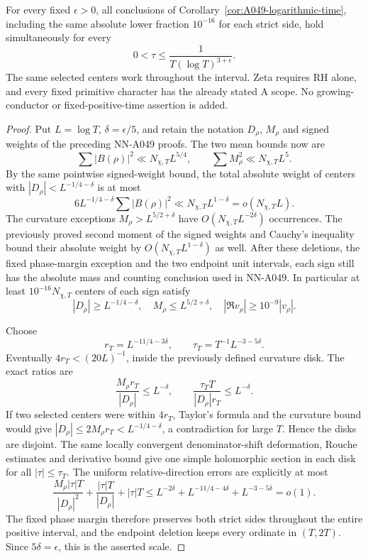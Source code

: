 \begin{corollary}
\label{cor:A049-logarithmic-three}
For every fixed \(\epsilon>0\), all conclusions of
Corollary~\ref{cor:A049-logarithmic-time}, including the same
absolute lower fraction \(10^{-16}\) for each strict side,
hold simultaneously for every
\[
                         0<\tau\le
                           \frac1{T(\log T)^{3+\epsilon}}.
\]
The same selected centers work throughout the interval.
Zeta requires RH alone, and every fixed primitive character
has the already stated A scope. No growing-conductor or
fixed-positive-time assertion is added.
\end{corollary}

\begin{proof}
Put \(L=\log T\), \(\delta=\epsilon/5\), and retain the
notation \(D_\rho\), \(M_\rho\) and signed weights of the
preceding NN-A049 proofs. The two mean bounds now are
\[
 \sum|B(\rho)|^2\ll N_{\chi,T}L^{5/4},\qquad
 \sum M_\rho^2\ll N_{\chi,T}L^5.
\]
By the same pointwise signed-weight bound, the total absolute
weight of centers with \(|D_\rho|<L^{-1/4-\delta}\) is at most
\[
                 6L^{-1/4-\delta}\sum|B(\rho)|^2
                       \ll N_{\chi,T}L^{1-\delta}
                         =o(N_{\chi,T}L).
\]
The curvature exceptions \(M_\rho>L^{5/2+\delta}\) have
\(O(N_{\chi,T}L^{-2\delta})\) occurrences. The previously
proved second moment of the signed weights and Cauchy's
inequality bound their absolute weight by
\(O(N_{\chi,T}L^{1-\delta})\) as well.
After these deletions, the fixed phase-margin exception and
the two endpoint unit intervals, each sign still has the
absolute mass and counting conclusion used in NN-A049.
In particular at least \(10^{-16}N_{\chi,T}\) centers of
each sign satisfy
\[
 |D_\rho|\ge L^{-1/4-\delta},\quad
 M_\rho\le L^{5/2+\delta},\quad
 |\Re v_\rho|\ge10^{-9}|v_\rho|.
\]

Choose
\[
 r_T=L^{-11/4-3\delta},\qquad
 \tau_T=T^{-1}L^{-3-5\delta}.
\]
Eventually \(4r_T<(20L)^{-1}\), inside the previously
defined curvature disk. The exact ratios are
\[
 \frac{M_\rho r_T}{|D_\rho|}\le L^{-\delta},\qquad
 \frac{\tau_TT}{|D_\rho|r_T}\le L^{-\delta}.
\]
If two selected centers were within \(4r_T\), Taylor's
formula and the curvature bound would give
\(|D_\rho|\le2M_\rho r_T< L^{-1/4-\delta}\), a contradiction
for large \(T\). Hence the disks are disjoint.
The same locally convergent denominator-shift deformation,
Rouche estimates and derivative bound give one simple
holomorphic section in each disk for all \(|\tau|\le\tau_T\).
The uniform relative-direction errors are explicitly at most
\[
 \frac{M_\rho|\tau|T}{|D_\rho|^2}
       +\frac{|\tau|T}{|D_\rho|}+|\tau|T
   \le L^{-2\delta}+L^{-11/4-4\delta}+L^{-3-5\delta}=o(1).
\]
The fixed phase margin therefore preserves both strict sides
throughout the entire positive interval, and the endpoint
deletion keeps every ordinate in \((T,2T)\).
Since \(5\delta=\epsilon\), this is the asserted scale.
\end{proof}

